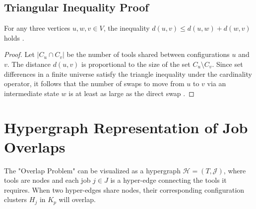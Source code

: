 \documentclass[12pt]{article}
\begin{document}
\subsection{Triangular Inequality Proof}
\begin{lemma}
For any three vertices $u, w, v \in V$, the inequality $d(u, v) \le d(u, w) + d(w, v)$ holds .
\end{lemma}
\begin{proof}
Let $|C_u \cap C_v|$ be the number of tools shared between configurations $u$ and $v$. The distance $d(u,v)$ is proportional to the size of the set $C_u \setminus C_v$. Since set differences in a finite universe satisfy the triangle inequality under the cardinality operator, it follows that the number of swaps to move from $u$ to $v$ via an intermediate state $w$ is at least as large as the direct swap .
\end{proof}

\section{Hypergraph Representation of Job Overlaps}

The "Overlap Problem" can be visualized as a hypergraph $\mathcal{H} = (T, \mathcal{J})$, where tools are nodes and each job $j \in J$ is a hyper-edge connecting the tools it requires. When two hyper-edges share nodes, their corresponding configuration clusters $H_j$ in $K_p$ will overlap.
\end{document}
